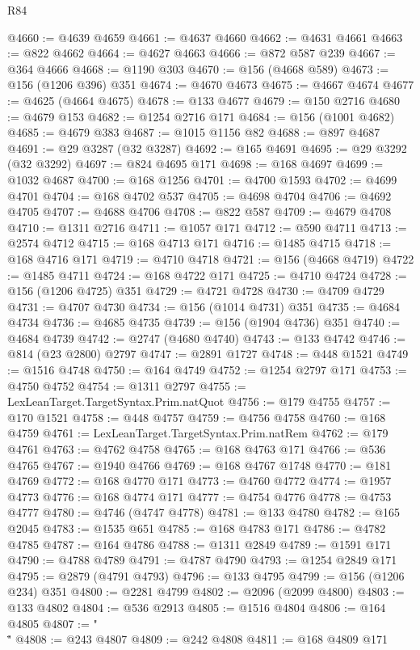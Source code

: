 \begin{lexlean}{R84}
\begin{coremodule}
@4660 := @4639 @4659
@4661 := @4637 @4660
@4662 := @4631 @4661
@4663 := @822 @4662
@4664 := @4627 @4663
@4666 := @872 @587 @239
@4667 := @364 @4666
@4668 := @1190 @303
@4670 := @156 (@4668 @589)
@4673 := @156 (@1206 @396) @351
@4674 := @4670 @4673
@4675 := @4667 @4674
@4677 := @4625 (@4664 @4675)
@4678 := @133 @4677
@4679 := @150 @2716
@4680 := @4679 @153
@4682 := @1254 @2716 @171
@4684 := @156 (@1001 @4682)
@4685 := @4679 @383
@4687 := @1015 @1156 @82
@4688 := @897 @4687
@4691 := @29 @3287 (@32 @3287)
@4692 := @165 @4691
@4695 := @29 @3292 (@32 @3292)
@4697 := @824 @4695 @171
@4698 := @168 @4697
@4699 := @1032 @4687
@4700 := @168 @1256
@4701 := @4700 @1593
@4702 := @4699 @4701
@4704 := @168 @4702 @537
@4705 := @4698 @4704
@4706 := @4692 @4705
@4707 := @4688 @4706
@4708 := @822 @587
@4709 := @4679 @4708
@4710 := @1311 @2716
@4711 := @1057 @171
@4712 := @590 @4711
@4713 := @2574 @4712
@4715 := @168 @4713 @171
@4716 := @1485 @4715
@4718 := @168 @4716 @171
@4719 := @4710 @4718
@4721 := @156 (@4668 @4719)
@4722 := @1485 @4711
@4724 := @168 @4722 @171
@4725 := @4710 @4724
@4728 := @156 (@1206 @4725) @351
@4729 := @4721 @4728
@4730 := @4709 @4729
@4731 := @4707 @4730
@4734 := @156 (@1014 @4731) @351
@4735 := @4684 @4734
@4736 := @4685 @4735
@4739 := @156 (@1904 @4736) @351
@4740 := @4684 @4739
@4742 := @2747 (@4680 @4740)
@4743 := @133 @4742
@4746 := @814 (@23 @2800) @2797
@4747 := @2891 @1727
@4748 := @448 @1521
@4749 := @1516 @4748
@4750 := @164 @4749
@4752 := @1254 @2797 @171
@4753 := @4750 @4752
@4754 := @1311 @2797
@4755 := LexLeanTarget.TargetSyntax.Prim.natQuot
@4756 := @179 @4755
@4757 := @170 @1521
@4758 := @448 @4757
@4759 := @4756 @4758
@4760 := @168 @4759
@4761 := LexLeanTarget.TargetSyntax.Prim.natRem
@4762 := @179 @4761
@4763 := @4762 @4758
@4765 := @168 @4763 @171
@4766 := @536 @4765
@4767 := @1940 @4766
@4769 := @168 @4767 @1748
@4770 := @181 @4769
@4772 := @168 @4770 @171
@4773 := @4760 @4772
@4774 := @1957 @4773
@4776 := @168 @4774 @171
@4777 := @4754 @4776
@4778 := @4753 @4777
@4780 := @4746 (@4747 @4778)
@4781 := @133 @4780
@4782 := @165 @2045
@4783 := @1535 @651
@4785 := @168 @4783 @171
@4786 := @4782 @4785
@4787 := @164 @4786
@4788 := @1311 @2849
@4789 := @1591 @171
@4790 := @4788 @4789
@4791 := @4787 @4790
@4793 := @1254 @2849 @171
@4795 := @2879 (@4791 @4793)
@4796 := @133 @4795
@4799 := @156 (@1206 @234) @351
@4800 := @2281 @4799
@4802 := @2096 (@2099 @4800)
@4803 := @133 @4802
@4804 := @536 @2913
@4805 := @1516 @4804
@4806 := @164 @4805
@4807 := "\\\""
@4808 := @243 @4807
@4809 := @242 @4808
@4811 := @168 @4809 @171

\end{coremodule}
\end{lexlean}
